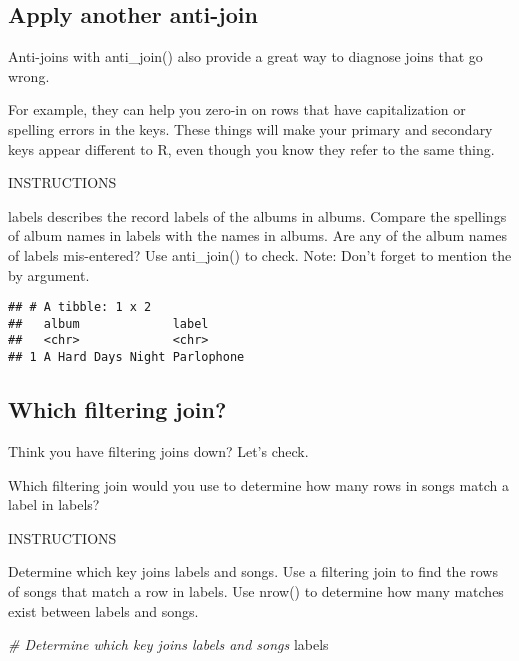 \documentclass[]{article}
\newenvironment{Shaded}{\begin{snugshade}}{\end{snugshade}}
\newcommand{\KeywordTok}[1]{\textcolor[rgb]{0.13,0.29,0.53}{\textbf{#1}}}
\newcommand{\DataTypeTok}[1]{\textcolor[rgb]{0.13,0.29,0.53}{#1}}
\newcommand{\StringTok}[1]{\textcolor[rgb]{0.31,0.60,0.02}{#1}}
\newcommand{\CommentTok}[1]{\textcolor[rgb]{0.56,0.35,0.01}{\textit{#1}}}
\newcommand{\OperatorTok}[1]{\textcolor[rgb]{0.81,0.36,0.00}{\textbf{#1}}}
\newcommand{\NormalTok}[1]{#1}
\begin{document}
\subsection{Apply another anti-join}\label{apply-another-anti-join}

Anti-joins with anti\_join() also provide a great way to diagnose joins
that go wrong.

For example, they can help you zero-in on rows that have capitalization
or spelling errors in the keys. These things will make your primary and
secondary keys appear different to R, even though you know they refer to
the same thing.

INSTRUCTIONS

labels describes the record labels of the albums in albums. Compare the
spellings of album names in labels with the names in albums. Are any of
the album names of labels mis-entered? Use anti\_join() to check. Note:
Don't forget to mention the by argument.

\begin{Shaded}
\end{Shaded}

\begin{verbatim}
## # A tibble: 1 x 2
##   album             label     
##   <chr>             <chr>     
## 1 A Hard Days Night Parlophone
\end{verbatim}

\subsection{Which filtering join?}\label{which-filtering-join}

Think you have filtering joins down? Let's check.

Which filtering join would you use to determine how many rows in songs
match a label in labels?

INSTRUCTIONS

Determine which key joins labels and songs. Use a filtering join to find
the rows of songs that match a row in labels. Use nrow() to determine
how many matches exist between labels and songs.

\begin{Shaded}
\begin{Highlighting}[]
\CommentTok{# Determine which key joins labels and songs}
\NormalTok{labels}
\end{Highlighting}
\end{Shaded}
\end{document}
